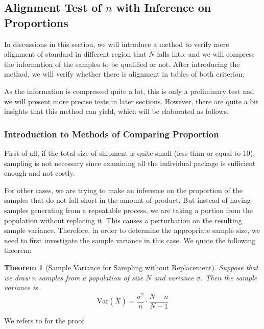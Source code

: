 \documentclass[12pt]{article}
\newtheorem{theorem}{Theorem}[section]
\def\Var{\mathrm{Var}}
\begin{document}
\subsection{Alignment Test of $n$ with Inference on Proportions}

In discussions in this section, we will introduce a method to verify mere alignment of standard in different region that $N$ falls into; and we will compress the information of the samples to be qualified or not. After introducing the method, we will verify whether there is alignment in tables of both criterion.

As the information is compressed quite a lot, this is only a preliminary test and we will present more precise tests in later sections. However, there are quite a bit insights that this method can yield, which will be elaborated as follows.

\subsubsection{Introduction to Methods of Comparing Proportion}

First of all, if the total size of shipment is quite small (less than or equal to 10), sampling is not necessary since examining all the individual package is sufficient enough and not costly. 

For other cases, we are trying to make an inference on the proportion of the samples that do not fall short in the amount of product. But instead of having samples generating from a repeatable process, we are taking a portion from the population without replacing it. This causes a perturbation on the resulting sample variance. Therefore, in order to determine the appropriate sample size, we need to first investigate the sample variance in this case. We quote the following theorem:

\begin{theorem}[Sample Variance for Sampling without Replacement]
    Suppose that we draw $n$ samples from a population of size $N$ and variance $\sigma$. Then the sample variance is
    $$
    \Var(\overline{X}) = \dfrac{\sigma^2}{n}\cdot\dfrac{N-n}{N-1}
    $$
\end{theorem}

We refers to \cite{Sampling} for the proof
\end{document}
